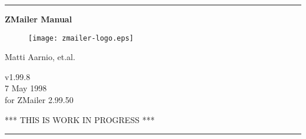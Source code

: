 \documentclass[twoside,a4paper,draft]{article}
\begin{document}
\startdocument

\begin{titlepage}
{
\hrule
\begin{center}
\bf
\Huge
\vspace{2ex}
ZMailer Manual \\
\vspace{2ex}

\begin{htmlonly}
\end{htmlonly}

\begin{figure}[h]
  \texttt{[image: zmailer-logo.eps]}
\end{figure}
\vspace{2ex}

\Large
Matti Aarnio, et.al. \\
\vspace{2ex}
\begin{htmlonly}
\vspace{1ex}
\end{htmlonly}
v1.99.8 \\
7 May 1998 \\
for ZMailer 2.99.50 \\
\vspace{2ex}
\begin{htmlonly}
\vspace{1ex}
\end{htmlonly}
\Large
\sf
*** THIS IS WORK IN PROGRESS ***
\end{center}
\vfill
\hrule
}
\end{titlepage}

\cleardoublepage


%
\end{document}
